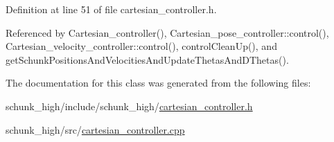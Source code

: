 Definition at line 51 of file cartesian\-\_\-controller.\-h.



Referenced by Cartesian\-\_\-controller(), Cartesian\-\_\-pose\-\_\-controller\-::control(), Cartesian\-\_\-velocity\-\_\-controller\-::control(), control\-Clean\-Up(), and get\-Schunk\-Positions\-And\-Velocities\-And\-Update\-Thetas\-And\-D\-Thetas().



The documentation for this class was generated from the following files\-:\begin{DoxyCompactItemize}
\item 
schunk\-\_\-high/include/schunk\-\_\-high/\hyperlink{cartesian__controller_8h}{cartesian\-\_\-controller.\-h}\item 
schunk\-\_\-high/src/\hyperlink{cartesian__controller_8cpp}{cartesian\-\_\-controller.\-cpp}\end{DoxyCompactItemize}
